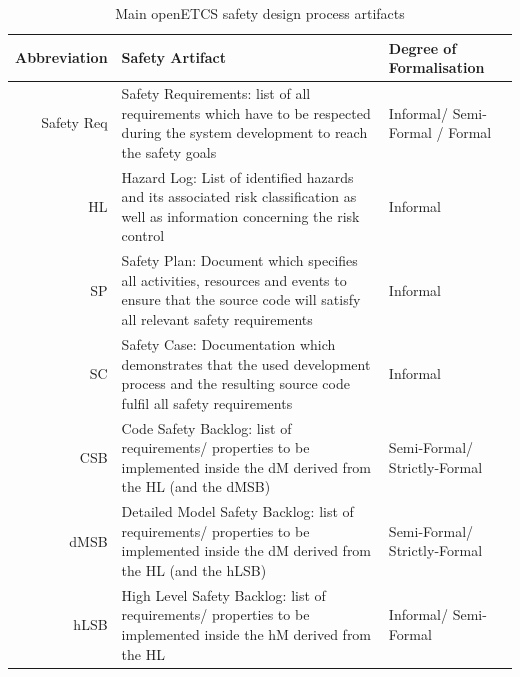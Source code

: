 \documentclass{template/openetcs_report}
\begin{document}
\begin{table}[htbp]
  \centering
  \caption{Main openETCS safety design process artifacts}
    \begin{tabular}{r|p{8cm}|p{4cm}}
    \textbf{Abbreviation} & \textbf{Safety Artifact} & \textbf{Degree of Formalisation}\\
    \hline
    Safety Req & Safety Requirements: list of all requirements which have to be respected during the system development to reach the safety goals & Informal/ Semi-Formal / Formal \\
    HL    & Hazard Log: List of identified hazards and its associated risk classification as well as information concerning the risk control & Informal \\
    SP    & Safety Plan: Document which specifies all activities, resources and events to ensure that the source code will satisfy all relevant safety requirements & Informal \\
    SC    & Safety Case: Documentation which demonstrates that the used development process and the resulting source code fulfil all safety requirements & Informal \\
    CSB   & Code Safety Backlog: list of requirements/ properties to be implemented inside the dM derived from  the HL (and the dMSB) & Semi-Formal/ Strictly-Formal \\
    dMSB  & Detailed Model Safety Backlog: list of requirements/ properties to be implemented inside the dM derived from the HL (and  the hLSB) & Semi-Formal/ Strictly-Formal \\
    hLSB  & High Level Safety Backlog: list of requirements/ properties to be implemented inside the hM derived from the HL & Informal/ Semi-Formal \\
    \end{tabular}%
  \label{tab:openETCS-Safety-artifacts}%
\end{table}%
\end{document}
